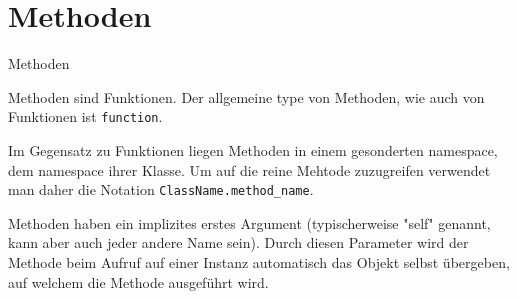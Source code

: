 \section{Methoden}
\begin{frame}{Methoden}

Methoden sind Funktionen. Der allgemeine type von Methoden, wie auch von Funktionen ist \texttt{function}. 

Im Gegensatz zu Funktionen liegen Methoden in einem gesonderten namespace, dem namespace ihrer Klasse. Um auf die reine Mehtode zuzugreifen verwendet man daher die Notation \texttt{ClassName.method_name}.

Methoden haben ein implizites erstes Argument (typischerweise "self" genannt, kann aber auch jeder andere Name sein). Durch diesen Parameter wird der Methode beim Aufruf auf einer Instanz automatisch das Objekt selbst übergeben, auf welchem die Methode ausgeführt wird.

\end{frame}



